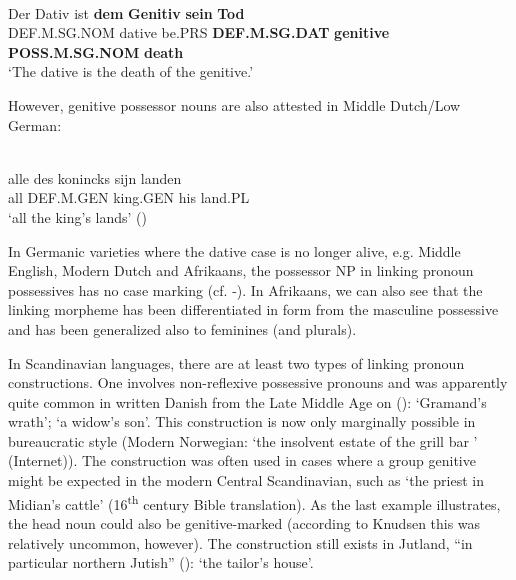 \ea\label{}
\\
\gll Der  Dativ  ist  \textbf{dem} \textbf{Genitiv} \textbf{sein} \textbf{Tod}\\
DEF.M.SG.NOM  dative  be.PRS  \textbf{DEF.M.SG.DAT} \textbf{genitive} \textbf{POSS.M.SG.NOM} \textbf{death}\\
\glt  ‘The dative is the death of the genitive.’
\z

 However, genitive possessor nouns are also attested in Middle Dutch/Low German:

\ea\label{}
\\
\gll alle  des  konincks  sijn  landen\\
all  DEF.M.GEN  king.GEN  his  land.PL\\
\glt ‘all the king’s lands’ (\citet[58]{Norde1997})
\z

In Germanic varieties where the dative case is no longer alive, e.g. Middle English, Modern Dutch and Afrikaans, the possessor NP in linking pronoun possessives has no case marking (cf. -). In Afrikaans, we can also see that the linking morpheme  has been differentiated in form from the masculine possessive  and has been generalized also to feminines (and plurals).

In Scandinavian languages, there are at least two types of linking pronoun constructions. One involves non-reflexive possessive pronouns and was apparently quite common in written Danish from the Late Middle Age on (\citet[61]{Knudsen1941}): ‘Gramand’s wrath’;  ‘a widow’s son’. This construction is now only marginally possible in bureaucratic style (Modern Norwegian:  ‘the insolvent estate of the grill bar ’ (Internet)). The construction was often used in cases where a group genitive might be expected in the modern Central Scandinavian, such as  ‘the priest in Midian’s cattle’ (16\textsuperscript{th} century Bible translation). As the last example illustrates, the head noun could also be genitive-marked (according to Knudsen this was relatively uncommon, however). The construction still exists in Jutland, “in particular northern Jutish” (\citet[62]{Knudsen1941}):  ‘the tailor’s house’.

